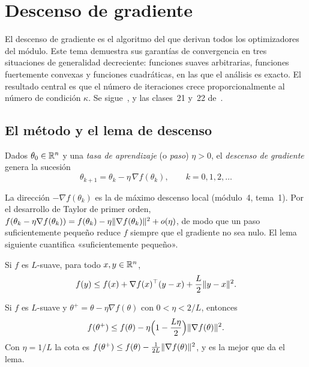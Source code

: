 \chapter{Descenso de gradiente}
\label{tema:2}

El descenso de gradiente es el algoritmo del que derivan todos los optimizadores del módulo. Este tema demuestra sus garantías de convergencia en tres situaciones de generalidad decreciente: funciones suaves arbitrarias, funciones fuertemente convexas y funciones cuadráticas, en las que el análisis es exacto. El resultado central es que el número de iteraciones crece proporcionalmente al número de condición $\kappa$. Se sigue~\cite[§9.2 y §9.3]{bv}, \cite[§12.3]{d2l} y las clases~21 y~22 de~\cite{mit18065}.

\section{El método y el lema de descenso}

\begin{definicion}\label{def:gd}
Dados $\theta_0\in\mathbb{R}^{n}$ y una \emph{tasa de aprendizaje} (o \emph{paso}) $\eta>0$, el \emph{descenso de gradiente} genera la sucesión
\[
\theta_{k+1}=\theta_k-\eta\,\nabla f(\theta_k),\qquad k=0,1,2,\dots
\]
\end{definicion}

La dirección $-\nabla f(\theta_k)$ es la de máximo descenso local (módulo~4, tema~1). Por el desarrollo de Taylor de primer orden, $f(\theta_k-\eta\nabla f(\theta_k))=f(\theta_k)-\eta\lVert\nabla f(\theta_k)\rVert^{2}+o(\eta)$, de modo que un paso suficientemente pequeño reduce $f$ siempre que el gradiente no sea nulo. El lema siguiente cuantifica «suficientemente pequeño».

\begin{lema}\label{lem:descenso}
Si $f$ es $L$-suave, para todo $x,y\in\mathbb{R}^{n}$,
\[
f(y)\le f(x)+\nabla f(x)^{\top}(y-x)+\frac{L}{2}\lVert y-x\rVert^{2}.
\]
\end{lema}

\begin{corolario}\label{cor:descenso}
Si $f$ es $L$-suave y $\theta^{+}=\theta-\eta\nabla f(\theta)$ con $0<\eta<2/L$, entonces
\[
f(\theta^{+})\le f(\theta)-\eta\Bigl(1-\frac{L\eta}{2}\Bigr)\lVert\nabla f(\theta)\rVert^{2}.
\]
Con $\eta=1/L$ la cota es $f(\theta^{+})\le f(\theta)-\frac{1}{2L}\lVert\nabla f(\theta)\rVert^{2}$, y es la mejor que da el lema.
\end{corolario}

